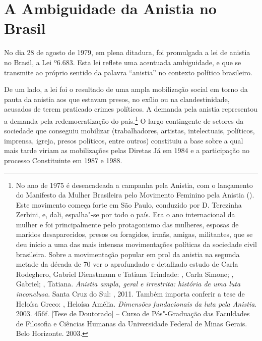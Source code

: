 \section{A Ambiguidade da Anistia no Brasil}

No dia 28 de agosto de 1979, em plena ditadura, foi promulgada a lei de
anistia no Brasil, a Lei º6.683. Esta lei reflete uma acentuada
ambiguidade, e que se transmite ao próprio sentido da palavra ``anistia''
no contexto político brasileiro.

De um lado, a lei foi o resultado de uma ampla mobilização social em
torno da pauta da anistia aos que estavam presos, no exílio ou na
clandestinidade, acusados de terem praticado crimes políticos. A demanda
pela anistia representou a demanda pela redemocratização do
país.\footnote{No ano de 1975 é desencadeada a campanha pela Anistia, com
  o lançamento do Manifesto da Mulher Brasileira pelo Movimento Feminino
  pela Anistia (). Este movimento começa forte em São Paulo,
  conduzido por D. Terezinha Zerbini, e, dali, espalha"-se por
  todo o país. Era o ano internacional da mulher e foi principalmente
  pelo protagonismo das mulheres, esposas de maridos desaparecidos,
  presos ou foragidos, irmãs, amigas, militantes, que se deu início a
  uma das mais intensas movimentações políticas da sociedade civil
  brasileira. Sobre a movimentação popular em prol da anistia na segunda
  metade da década de 70 ver o aprofundado e detalhado estudo de Carla
  Rodeghero, Gabriel Dienstmann e Tatiana Trindade: , Carla
  Simone; , Gabriel; , Tatiana. \emph{Anistia ampla,
  geral e irrestrita: história de uma luta inconclusa}. Santa Cruz do
  Sul: , 2011. Também importa conferir a tese de Heloísa Greco:
  , Heloísa Amélia. \emph{Dimensões fundacionais da luta pela
  Anistia}. 2003. 456f. {[}Tese de Doutorado{]} -- Curso de
  Pós"-Graduação das Faculdades de Filosofia e Ciências Humanas da
  Universidade Federal de Minas Gerais. Belo Horizonte. 2003.} O largo
contingente de setores da sociedade que conseguiu mobilizar
(trabalhadores, artistas, intelectuais, políticos, imprensa, igreja,
presos políticos, entre outros) constituiu a base sobre a qual mais
tarde viriam as mobilizações pelas Diretas Já em 1984 e a participação
no processo Constituinte em 1987 e 1988.

